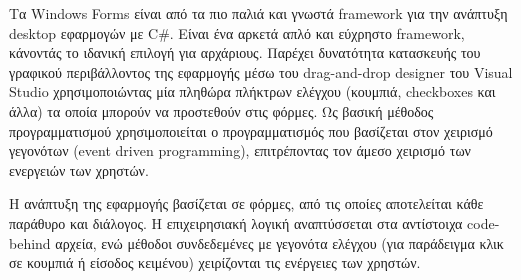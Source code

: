 Τα Windows Forms είναι από τα πιο παλιά και γνωστά framework για την ανάπτυξη desktop εφαρμογών με C\#. 
Είναι ένα αρκετά απλό και εύχρηστο framework, κάνοντάς το ιδανική επιλογή για αρχάριους.
Παρέχει δυνατότητα κατασκευής του γραφικού περιβάλλοντος της εφαρμογής μέσω του drag-and-drop designer 
του Visual Studio χρησιμοποιώντας μία πληθώρα πλήκτρων ελέγχου (κουμπιά, checkboxes  και άλλα) τα οποία 
μπορούν να προστεθούν στις φόρμες. Ως βασική μέθοδος προγραμματισμού χρησιμοποιείται ο προγραμματισμός
που βασίζεται στον χειρισμό γεγονότων (event driven programming), επιτρέποντας τον άμεσο χειρισμό των
ενεργειών των χρηστών. 

Η ανάπτυξη της εφαρμογής βασίζεται σε φόρμες, από τις οποίες αποτελείται κάθε παράθυρο και διάλογος.
Η επιχειρησιακή λογική αναπτύσσεται στα αντίστοιχα code-behind αρχεία, ενώ μέθοδοι συνδεδεμένες με 
γεγονότα ελέγχου (για παράδειγμα κλικ σε κουμπιά ή είσοδος κειμένου) χειρίζονται τις ενέργειες των χρηστών.
